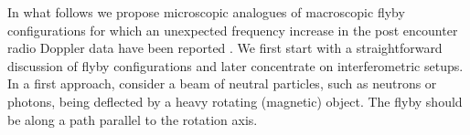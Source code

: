 \documentclass[prl,preprint,amsfonts,showpacs,showkeys]{revtex4}
\begin{document}
In what follows we propose microscopic analogues of macroscopic flyby configurations for which an unexpected frequency increase
in the post encounter radio Doppler data have been reported \cite{anderson:091102,anderson:newast,Dittus}.
We first start with a straightforward discussion of flyby configurations and later concentrate on interferometric setups.
In a first approach, consider a beam of neutral particles, such as neutrons or photons, being deflected by a heavy rotating (magnetic) object.
The flyby should be along a path parallel to the rotation axis.
\end{document}
